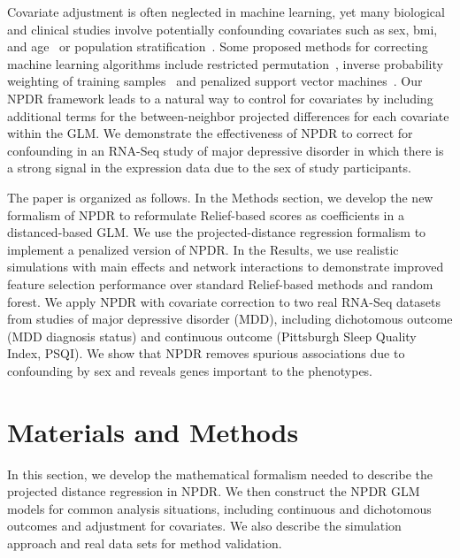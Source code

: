 \documentclass[10pt]{article}
\begin{document}
Covariate adjustment is often neglected in machine learning, yet many biological and clinical studies involve potentially confounding covariates such as sex, bmi, and age~\cite{le18_brainagesim} or population stratification~\cite{popstrat16}.
Some proposed methods for correcting machine learning algorithms include restricted permutation~\cite{rao2017}, inverse probability weighting of training samples~\cite{linn2016} and penalized support vector machines~\cite{li2011ccsvm}.
Our NPDR framework leads to a natural way to control for covariates by including additional terms for the between-neighbor projected differences for each covariate within the GLM.
We demonstrate the effectiveness of NPDR to correct for confounding in an RNA-Seq study of major depressive disorder in which there is a strong signal in the expression data due to the sex of study participants. 

The paper is organized as follows.
In the Methods section, we develop the new formalism of NPDR to reformulate Relief-based scores as coefficients in a distanced-based GLM.
We use the projected-distance regression formalism to implement a penalized version of NPDR. 
In the Results, we use realistic simulations with main effects and network interactions to demonstrate improved feature selection performance over standard Relief-based methods and random forest. 
We apply NPDR with covariate correction to two real RNA-Seq datasets from studies of major depressive disorder (MDD), including dichotomous outcome (MDD diagnosis status) and continuous outcome (Pittsburgh Sleep Quality Index, PSQI).
We show that NPDR removes spurious associations due to confounding by sex and reveals genes important to the phenotypes.



\section{Materials and Methods}
In this section, we develop the mathematical formalism needed to describe the projected distance regression in NPDR. We then construct the NPDR GLM models for common analysis situations, including continuous and dichotomous outcomes and adjustment for covariates. We also describe the simulation approach and real data sets for method validation. 
\end{document}
